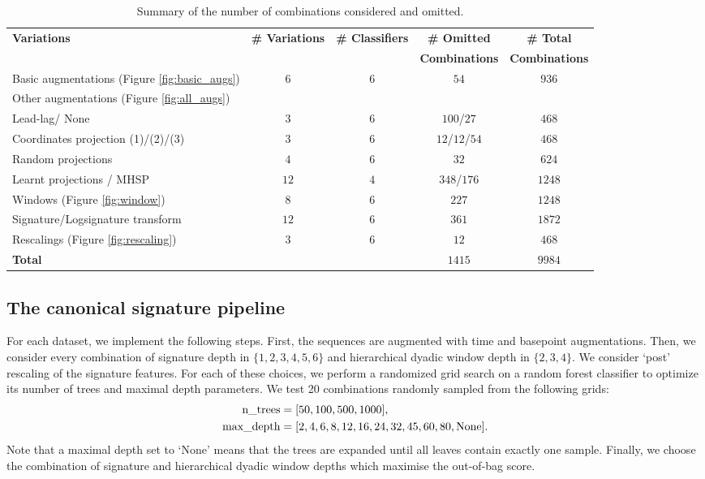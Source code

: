 \documentclass{article}
\theoremstyle{definition}
\theoremstyle{remark}
\begin{document}
	\begin{table}[h]
		\caption{Summary of the number of combinations considered and omitted.}\label{tab:omissions}
		\begin{tabular}{lcccc}
		\toprule
		\textbf{Variations } & \textbf{\# Variations} & \textbf{\# Classifiers} & \textbf{\# Omitted } &\textbf{\# Total}  \\
		& & & \textbf{Combinations} & \textbf{Combinations} \\
		\midrule
		Basic augmentations (Figure \ref{fig:basic_augs}) & $6$ & $6$ & $54$ &  $936$\\
		\cmidrule{1-1}
		Other augmentations (Figure \ref{fig:all_augs}) \\
		Lead-lag/ None & $3$ & $6$ & $100$/$27$ & $468$ \\
		Coordinates projection (1)/(2)/(3)& $3$ & $6$ & $12$/$12$/$54$ & $468$ \\
		Random projections & $4$ & $6$ & $32$ & $624$ \\
		Learnt projections / MHSP & $12$ & $4$ & $348$/$176$ & $1248$\\
		\cmidrule{1-1}
		Windows (Figure \ref{fig:window}) & $8$ & $6$ & $227$ & $1248$ \\
		\cmidrule{1-1}
		Signature/Logsignature transform & $12$ & $6$ &$361$ &$1872$ \\ 
		\cmidrule{1-1}
		Rescalings (Figure \ref{fig:rescaling}) & $3$ & $6$ &$12$ & $468$ \\
		\midrule{}
		\textbf{Total} & & & $1415$ & $9984$ \\
		\bottomrule
		\end{tabular}
	\end{table}
	

	\subsection{The canonical signature pipeline}
	\label{sec:best_rf_details}

	For each dataset, we implement the following steps. First, the sequences are augmented with time and basepoint augmentations. Then, we consider every combination of signature depth in $\{1, 2, 3, 4, 5, 6\}$ and hierarchical dyadic window depth in $\{2, 3, 4\}$. We consider `post' rescaling of the signature features. For each of these choices, we perform a randomized grid search on a random forest classifier to optimize its number of trees and maximal depth parameters. We test 20 combinations randomly sampled from the following grids:
	\begin{align*}
	    \textnormal{n\_trees}&=[50, 100, 500, 1000], \\
       \textnormal{max\_depth}&=[2, 4, 6, 8, 12, 16, 24, 32, 45, 60, 80, \textnormal{None}].
     \end{align*}
     Note that a maximal depth set to `None' means that the trees are expanded until all leaves contain exactly one sample. Finally, we choose the combination of signature and hierarchical dyadic window depths which maximise the out-of-bag score. 
     
\end{document}
